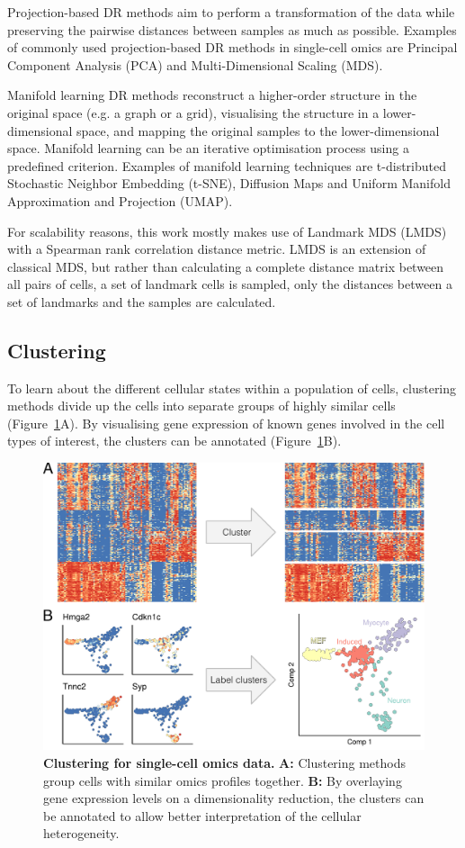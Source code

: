 Projection-based DR methods aim to perform a transformation of the data while preserving the pairwise distances between samples as much as possible. Examples of commonly used projection-based DR methods in single-cell omics are Principal Component Analysis\cite{pearson_liiilinesplanes_1901} (PCA) and Multi-Dimensional Scaling\cite{kruskal_multidimensionalscalingoptimizing_1964} (MDS). 

Manifold learning DR methods reconstruct a higher-order structure in the original space (e.g. a graph or a grid), visualising the structure in a lower-dimensional space, and mapping the original samples to the lower-dimensional space. Manifold learning can be an iterative optimisation process using a predefined criterion. Examples of manifold learning techniques are t-distributed Stochastic Neighbor Embedding\cite{vandermaaten_visualizingdatausing_2008} (t-SNE), Diffusion Maps\cite{nadler_diffusion_2005,coifman_diffusionmaps_2006} and Uniform Manifold Approximation and Projection\cite{mcinnes_umapuniformmanifold_2018} (UMAP). 

For scalability reasons, this work mostly makes use of Landmark MDS\cite{silva_globallocalmethods_2002,lee_landmarkmdsensemble_2009} (LMDS) with a Spearman rank correlation distance metric. LMDS is an extension of classical MDS, but rather than calculating a complete distance matrix between all pairs of cells, a set of landmark cells is sampled, only the distances between a set of landmarks and the samples are calculated. 

\subsection{Clustering}
To learn about the different cellular states within a population of cells, clustering methods divide up the cells into separate groups of highly similar cells (Figure~\ref{fig:comp_tools_cluster}A). 
By visualising gene expression of known genes involved in the cell types of interest, the clusters can be annotated (Figure~\ref{fig:comp_tools_cluster}B). 

\begin{figure}[htb!]
	\centering
	\includegraphics[width=.6\linewidth]{fig/comptools2/comptool_2_clustering.pdf} 
	\caption{
		\textbf{Clustering for single-cell omics data.}
		\textbf{A:} Clustering methods group cells with similar omics profiles together. 
		\textbf{B:} By overlaying gene expression levels on a dimensionality reduction, the clusters can be annotated to allow better interpretation of the cellular heterogeneity.
	}
	\label{fig:comp_tools_cluster}
\end{figure}


